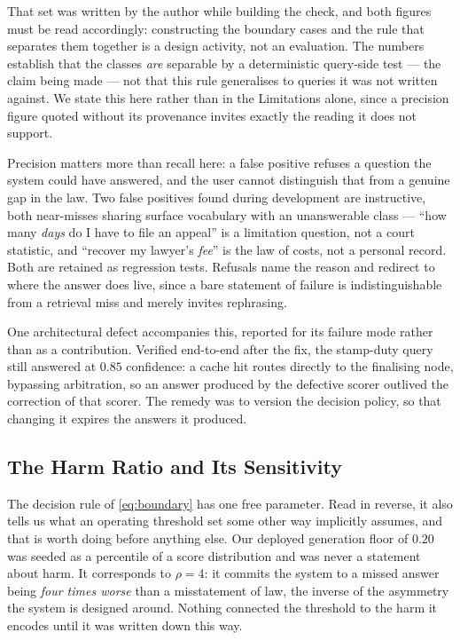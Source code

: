 \documentclass[conference]{IEEEtran}
\begin{document}
That set was written by the author while building the check, and both figures
must be read accordingly: constructing the boundary cases and the rule that
separates them together is a design activity, not an evaluation. The numbers
establish that the classes \emph{are} separable by a deterministic query-side
test --- the claim being made --- not that this rule generalises to queries it
was not written against. We state this here rather than in the Limitations
alone, since a precision figure quoted without its provenance invites exactly
the reading it does not support.

Precision matters more than recall here: a false positive refuses a question
the system could have answered, and the user cannot distinguish that from a
genuine gap in the law. Two false positives found during development are
instructive, both near-misses sharing surface vocabulary with an unanswerable
class --- ``how many \emph{days} do I have to file an appeal'' is a limitation
question, not a court statistic, and ``recover my lawyer's \emph{fee}'' is the
law of costs, not a personal record. Both are retained as regression tests.
Refusals name the reason and redirect to where the answer does live, since a
bare statement of failure is indistinguishable from a retrieval miss and merely
invites rephrasing.

One architectural defect accompanies this, reported for its failure mode rather
than as a contribution. Verified end-to-end after the fix, the stamp-duty query
still answered at $0.85$ confidence: a cache hit routes directly to the
finalising node, bypassing arbitration, so an answer produced by the defective
scorer outlived the correction of that scorer. The remedy was to version the
decision policy, so that changing it expires the answers it produced.

\subsection{The Harm Ratio and Its Sensitivity}
\label{sec:rho}
The decision rule of \eqref{eq:boundary} has one free parameter. Read in
reverse, it also tells us what an operating threshold set some other way
implicitly assumes, and that is worth doing before anything else. Our deployed
generation floor of $0.20$ was seeded as a percentile of a score distribution
and was never a statement about harm. It corresponds to $\rho = 4$: it commits
the system to a missed answer being \emph{four times worse} than a misstatement
of law, the inverse of the asymmetry the system is designed around. Nothing
connected the threshold to the harm it encodes until it was written down this
way.
\end{document}
